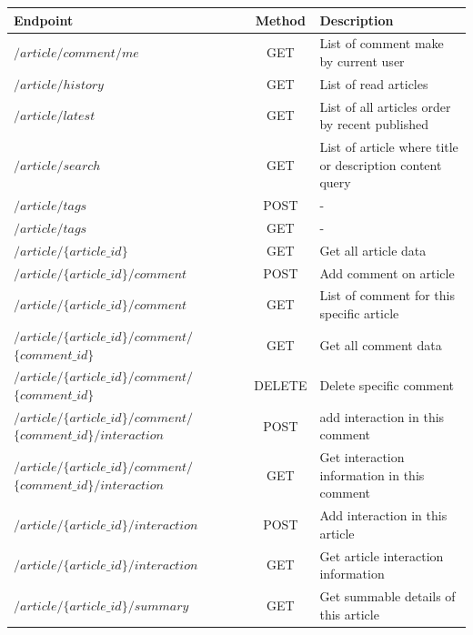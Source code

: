 \begin{tabularx}{\textwidth}{XcX}
  \toprule
  Endpoint & Method & Description \\
  \midrule
  $/article/comment/me$ & GET & List of comment make by current user \\
  $/article/history$ & GET & List of read articles \\
  $/article/latest$ & GET & List of all articles order by recent published \\
  $/article/search$ & GET & List of article where title or description content query \\
  $/article/tags$ & POST & - \\
  $/article/tags$ & GET & - \\
  $/article/\{article\_id\}$ & GET & Get all article data \\
  $/article/\{article\_id\}/comment$ & POST & Add comment on article \\
  $/article/\{article\_id\}/comment$ & GET & List of comment for this specific article \\
  $/article/\{article\_id\}/comment/$ $\{comment\_id\}$ & GET & Get all comment data \\
  $/article/\{article\_id\}/comment/$ $\{comment\_id\}$ & DELETE & Delete specific comment \\
  $/article/\{article\_id\}/comment/$ $\{comment\_id\}/interaction$ & POST & add interaction in this comment \\
  $/article/\{article\_id\}/comment/$ $\{comment\_id\}/interaction$ & GET & Get interaction information in this comment \\
  $/article/\{article\_id\}/interaction$ & POST & Add interaction in this article \\
  $/article/\{article\_id\}/interaction$ & GET & Get article interaction information \\
  $/article/\{article\_id\}/summary$ & GET & Get summable details of this article \\
  \bottomrule
\end{tabularx}


